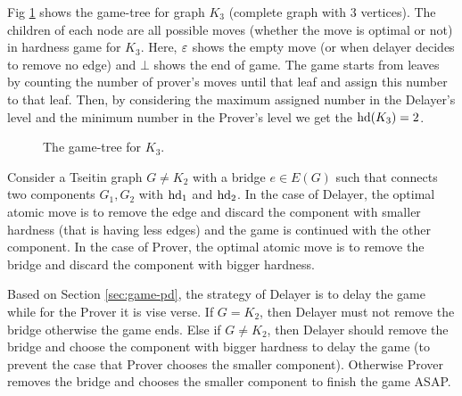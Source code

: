 \documentclass{report}
\begin{document}
\begin{examp}\label{exp:gg1}
Fig \ref{fig:gg1} shows the game-tree for graph $K_3$ (complete graph with 3 vertices). The children of each node are all possible moves (whether the move is optimal or not) in hardness game for $K_3$. Here, $\varepsilon $ shows the empty move (or when delayer decides to remove no edge) and $\bot$ shows the end of game. The game starts from leaves by counting the number of prover's moves until that leaf and assign this number to that leaf. Then, by considering the maximum assigned number in the Delayer's level and the minimum number in the Prover's level we get the $\operatorname{hd}(K_3)=2$.
   \begin{figure}
   \begin{center}
   \caption{The game-tree for $K_3$.}
   \label{fig:gg1}
   \end{center}
   \end{figure}
\end{examp}

\begin{lem}\label{lem:tseitin-game-bridge}
Consider a Tseitin graph $G \not = K_2$ with a bridge $e \in E(G)$ such that connects two components $G_1,G_2$ with $\operatorname{hd}_1$ and $\operatorname{hd}_2$. In the case of Delayer, the optimal atomic move is to remove the edge and discard the component with smaller hardness (that is having less edges) and the game is continued with the other component. In the case of Prover, the optimal atomic move is to remove the bridge and discard the component with bigger hardness.
\end{lem}
\begin{prf}
Based on Section \ref{sec:game-pd}, the strategy of Delayer is to delay the game while for the Prover it is vise verse. If $G=K_2$, then Delayer must not remove the bridge otherwise the game ends. Else if $G \not = K_2$, then Delayer should remove the bridge and choose the component with bigger hardness to delay the game (to prevent the case that Prover chooses the smaller component). Otherwise Prover removes the bridge and chooses the smaller component to finish the game ASAP.
\end{prf}
\end{document}
